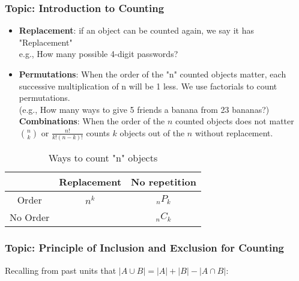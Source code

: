 \documentclass{article}
\begin{document}
\subsubsection{Topic: Introduction to Counting}
\begin{itemize}
    \item \textbf{Replacement}: if an object can be counted again, we say it has "Replacement"\\
    e.g., How many possible 4-digit passwords?
    \item \textbf{Permutations}: When the order of the "n" counted objects matter, each successive multiplication of n will be 1 less. We use factorials to count permutations.\\
    (e.g., How many ways to give 5 friends a banana from 23 bananas?)
    \textbf{Combinations}: When the order of the $n$ counted objects does not matter $\binom{n}{k}$ or $\frac{n!}{k!(n-k)!}$ counts $k$ objects out of the $n$ without replacement.

\end{itemize}

\begin{table}[ht]
    \centering
    \begin{tabular}{c|cc}
                    &  Replacement& No repetition\\
    \hline Order      &  $n^{k}$& $_{n}P_{k}$\\
         No Order   &  & $_{n}C_{k}$\\
    \end{tabular}
    \caption{Ways to count "n" objects}
\end{table}

\subsubsection{Topic: Principle of Inclusion and Exclusion for Counting}
Recalling from past units that $|A\cup B| = |A|+|B|-|A\cap B|$:
\\
\end{document}
